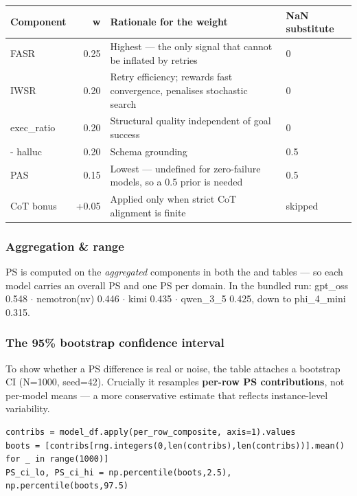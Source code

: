 \begin{table}[h]\small
\centering
\begin{tabularx}{\linewidth}{@{}l r I P@{}}
\toprule
Component & w & Rationale for the weight & NaN substitute\\
\midrule
FASR & 0.25 & Highest --- the only signal that cannot be inflated by retries & 0\\
\addlinespace
IWSR & 0.20 & Retry efficiency; rewards fast convergence, penalises stochastic search & 0\\
\addlinespace
exec\_ratio & 0.20 & Structural quality independent of goal success & 0\\
 - halluc & 0.20 & Schema grounding & 0.5\\
\addlinespace
PAS & 0.15 & Lowest --- undefined for zero-failure models, so a 0.5 prior is needed & 0.5\\
\addlinespace
CoT bonus & +0.05 & Applied only when strict CoT alignment is finite & skipped\\
\bottomrule
\end{tabularx}
\end{table}

\subsubsection{Aggregation \& range}

PS is computed on the \emph{aggregated} components in both the  and  tables --- so each model carries an overall PS and one PS per domain. In the bundled run: gpt\_oss 0.548 \(\cdot\) nemotron(nv) 0.446 \(\cdot\) kimi 0.435 \(\cdot\) qwen\_3\_5 0.425, down to phi\_4\_mini 0.315.

\subsubsection{The 95\% bootstrap confidence interval}

To show whether a PS difference is real or noise, the  table attaches a bootstrap CI (N=1000, seed=42). Crucially it resamples \textbf{per-row PS contributions}, not per-model means --- a more conservative estimate that reflects instance-level variability.

\begin{lstlisting}
contribs = model_df.apply(per_row_composite, axis=1).values
boots = [contribs[rng.integers(0,len(contribs),len(contribs))].mean() for _ in range(1000)]
PS_ci_lo, PS_ci_hi = np.percentile(boots,2.5), np.percentile(boots,97.5)
\end{lstlisting}



